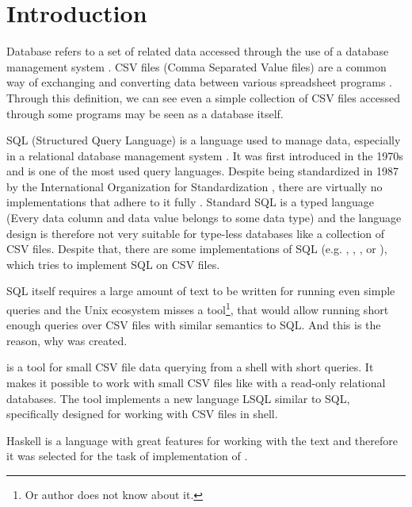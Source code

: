 \chapter*{Introduction}

Database refers to a set of related data accessed through the use of a database management system \cite{enwiki-database}.
CSV files (Comma Separated Value files) are a common way of exchanging and converting data between various spreadsheet programs \cite{rfc4180}.
Through this definition, we can see even a simple collection of CSV files accessed through some programs may be seen as a database itself.


SQL (Structured Query Language) is a language used to manage data, especially in a relational database management system \cite{enwiki-sql}.
It was first introduced in the 1970s \cite{enwiki-sql} and is one of the most used query languages. 
Despite being standardized in 1987 by the International Organization for Standardization \cite{ISO9075-1987}, 
there are virtually no implementations that adhere to it fully \cite{enwiki-sql}.
Standard SQL is a typed language (Every data column and data value belongs to some data type) \cite{ISO9075-2023} and the language
design is therefore not very suitable for type-less databases like a collection of CSV files.
Despite that, there are some implementations of SQL (e.g.  \cite{q},  \cite{csv-sql},  \cite{trdsql}, or  \cite{csvq}), which tries to implement SQL on CSV files.

SQL itself requires a large amount of text to be written for running even simple queries and the Unix ecosystem misses a tool\footnote{Or author does not know about it.}, 
that would allow running short enough queries over CSV files with similar semantics to SQL. And this is the reason, why  was created.

 is a tool for small CSV file data querying from a shell with short queries. It makes it possible to work with small CSV files like with a read-only relational databases.
The tool implements a new language LSQL similar to SQL, specifically designed for working with CSV files in shell.

Haskell is a language with great features for working with the text \cite{practical-haskell} and therefore it was selected for the task of implementation of .
